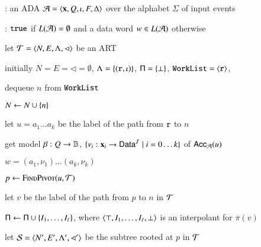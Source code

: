 \documentclass[10pt,conference,letterpaper,twocolumn]{IEEEtran}
\begin{document}
\begin{algorithm}[t!]
{\scriptsize\begin{algorithmic}[0]
: an ADA $\mathcal{A} = \left\langle \mathbf x,Q,\iota,F,\Delta \right\rangle$
over the alphabet $\Sigma$ of input events

: $\mathtt{true}$ if $L(\mathcal{A})=\emptyset$ and a data word $w
\in L(\mathcal{A})$ otherwise
\end{algorithmic}}

{\scriptsize\begin{algorithmic}[1] 

  \State let $\mathcal{T} = \left\langle N,E,\Lambda,\lhd \right\rangle$ be an ART 

  \State initially $N = E = \lhd = \emptyset$, $\Lambda =
  \left\{ (\mathtt{r},\iota) \right\}$, $\mathsf{\Pi} = \left\{ \bot \right\}$, $\mathtt{WorkList} =
  \left\langle \mathtt{r} \right\rangle$,

  \While {$\worklist \neq \emptyset$}
  \label{ln:while}
  
  \State dequeue $n$ from $\mathtt{WorkList}$ 

  \State $N \leftarrow N \cup \left\{ n \right\}$

   

  \State let $u = a_1\ldots a_k$ be the label of the path from
  $\mathtt{r}$ to $n$ 

   

  \State get model $\beta : Q \rightarrow \mathbb{B}$, $\{\nu_i :
  \mathbf x_i \rightarrow \mathsf{Data}^{\mathcal{I}} \mid i=0\ldots k\}$ of $\mathsf{Acc}_{\mathcal{A}}(u)$

   $w = (a_1,\nu_1) \ldots (a_k,\nu_k)$
  \label{ln:cex}

  \Else {}

  \State $p \leftarrow \Call{FindPivot}{u,\Art}$
  \label{ln:pivot}

  \State let $v$ be the label of the path from $p$ to $n$ in $\mathcal{T}$
  
  \State $\mathsf{\Pi} \leftarrow \mathsf{\Pi} \cup \left\{ I_1,\ldots,I_\ell \right\}$,
  where $\left\langle \top,I_1,\ldots,I_\ell,\bot \right\rangle$ is an interpolant for
  $\overline{\pi}(v)$

  \State let $\mathcal{S} = \left\langle N',E',\Lambda',\lhd' \right\rangle$ be the subtree
  rooted at $p$ in $\mathcal{T}$



\end{algorithmic}}
\end{algorithm}
\end{document}
